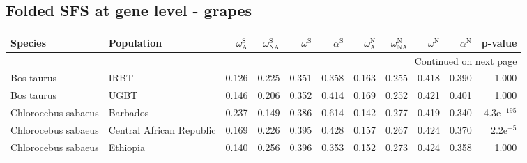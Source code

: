 \subsection{Folded SFS at gene level - grapes} 
\begin{longtable}{llrrrrrrrrr}
\toprule
             Species &                Population & $\omega_{\textrm{A}}^{\textrm{S}}$ & $\omega_{\textrm{NA}}^{\textrm{S}}$ & $\omega^{\textrm{S}}$ & $\alpha^{\textrm{S}}$ & $\omega_{\textrm{A}}^{\textrm{N}}$ & $\omega_{\textrm{NA}}^{\textrm{N}}$ & $\omega^{\textrm{N}}$ & $\alpha^{\textrm{N}}$ &       p-value \\
\midrule
\endhead
\midrule
\multicolumn{11}{r}{{Continued on next page}} \\
\midrule
\endfoot

\bottomrule
\endlastfoot
          Bos taurus &                      IRBT &                              0.126 &                               0.225 &                 0.351 &                 0.358 &                              0.163 &                               0.255 &                 0.418 &                 0.390 &         1.000 \\
          Bos taurus &                      UGBT &                              0.146 &                               0.206 &                 0.352 &                 0.414 &                              0.169 &                               0.252 &                 0.421 &                 0.401 &         1.000 \\
 Chlorocebus sabaeus &                  Barbados &                              0.237 &                               0.149 &                 0.386 &                 0.614 &                              0.142 &                               0.277 &                 0.419 &                 0.340 & 4.3e$^{-195}$ \\
 Chlorocebus sabaeus &  Central African Republic &                              0.169 &                               0.226 &                 0.395 &                 0.428 &                              0.157 &                               0.267 &                 0.424 &                 0.370 &   2.2e$^{-5}$ \\
 Chlorocebus sabaeus &                  Ethiopia &                              0.140 &                               0.256 &                 0.396 &                 0.353 &                              0.152 &                               0.273 &                 0.424 &                 0.358 &         1.000 \\

\end{longtable}
